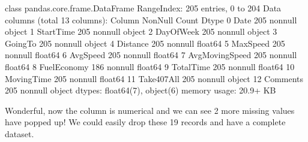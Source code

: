 \documentclass[letterpaper,10pt,english]{jupyterBook}
\begin{document}
\begin{sphinxVerbatim}[commandchars=\\\{\}]
\PYGZlt{}class \PYGZsq{}pandas.core.frame.DataFrame\PYGZsq{}\PYGZgt{}
RangeIndex: 205 entries, 0 to 204
Data columns (total 13 columns):
 \PYGZsh{}   Column          Non\PYGZhy{}Null Count  Dtype  
\PYGZhy{}\PYGZhy{}\PYGZhy{}  \PYGZhy{}\PYGZhy{}\PYGZhy{}\PYGZhy{}\PYGZhy{}\PYGZhy{}          \PYGZhy{}\PYGZhy{}\PYGZhy{}\PYGZhy{}\PYGZhy{}\PYGZhy{}\PYGZhy{}\PYGZhy{}\PYGZhy{}\PYGZhy{}\PYGZhy{}\PYGZhy{}\PYGZhy{}\PYGZhy{}  \PYGZhy{}\PYGZhy{}\PYGZhy{}\PYGZhy{}\PYGZhy{}  
 0   Date            205 non\PYGZhy{}null    object 
 1   StartTime       205 non\PYGZhy{}null    object 
 2   DayOfWeek       205 non\PYGZhy{}null    object 
 3   GoingTo         205 non\PYGZhy{}null    object 
 4   Distance        205 non\PYGZhy{}null    float64
 5   MaxSpeed        205 non\PYGZhy{}null    float64
 6   AvgSpeed        205 non\PYGZhy{}null    float64
 7   AvgMovingSpeed  205 non\PYGZhy{}null    float64
 8   FuelEconomy     186 non\PYGZhy{}null    float64
 9   TotalTime       205 non\PYGZhy{}null    float64
 10  MovingTime      205 non\PYGZhy{}null    float64
 11  Take407All      205 non\PYGZhy{}null    object 
 12  Comments        205 non\PYGZhy{}null    object 
dtypes: float64(7), object(6)
memory usage: 20.9+ KB
\end{sphinxVerbatim}

\sphinxAtStartPar
Wonderful, now the column is numerical and we can see 2 more missing values have popped up!
We could easily drop these 19 records and have a complete dataset.

\begin{sphinxVerbatim}[commandchars=\\\{\}]
\end{sphinxVerbatim}
\end{document}

